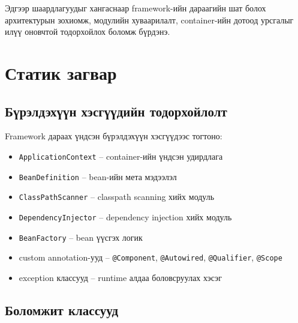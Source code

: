 Эдгээр шаардлагуудыг хангаснаар framework-ийн дараагийн шат болох архитектурын зохиомж, модулийн хуваарилалт, container-ийн дотоод урсгалыг илүү оновчтой тодорхойлох боломж бүрдэнэ.


\section{Статик загвар}

\subsection{Бүрэлдэхүүн хэсгүүдийн тодорхойлолт}

Framework дараах үндсэн бүрэлдэхүүн хэсгүүдээс тогтоно:

\begin{itemize}
    \item \texttt{ApplicationContext} -- container-ийн үндсэн удирдлага
    \item \texttt{BeanDefinition} -- bean-ийн мета мэдээлэл
    \item \texttt{ClassPathScanner} -- classpath scanning хийх модуль
    \item \texttt{DependencyInjector} -- dependency injection хийх модуль
    \item \texttt{BeanFactory} -- bean үүсгэх логик
    \item custom annotation-ууд -- \texttt{@Component}, \texttt{@Autowired}, \texttt{@Qualifier}, \texttt{@Scope}
    \item exception классууд -- runtime алдаа боловсруулах хэсэг
\end{itemize}

\subsection{Боломжит классууд}

